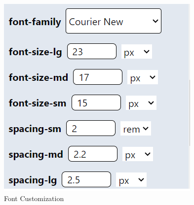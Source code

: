 \begin{figure}[H]
    \centering
    \begin{minipage}{0.5\textwidth} %
        \centering
        \vspace{+64pt}
        \includegraphics[width=\linewidth]{images/customization 1.png}
        \caption{Font Customization}
        \label{fig:c1}
    \end{minipage}%
    \hfill
    \begin{minipage}{0.5\textwidth}
        \centering

\end{minipage}
\end{figure}
